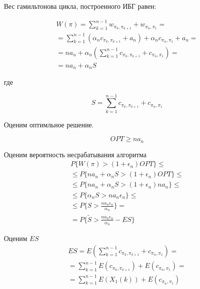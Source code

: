 \documentclass[a4paper, 14pt]{extarticle}
\begin{document}
Вес гамильтонова цикла, построенного ИБГ равен:

\begin{equation}
\begin{aligned}
W(\pi) = \sum_{k=1}^{n-1} w_{\pi_k, \pi_{k+1}} + w_{\pi_n, \pi_{1}} = \\
= \sum_{k=1}^{n-1} (\alpha_n c_{\pi_k, \pi_{k+1}} + a_n) +\alpha_n c_{\pi_n, \pi_{1}} + a_n = \\
= na_n + \alpha_n( \sum_{k=1}^{n-1} c_{\pi_k, \pi_{k+1}} + c_{\pi_n, \pi_1}) = \\
= na_n + \alpha_n S
\end{aligned}
\end{equation}

где

\begin{equation}
S = \sum_{k=1}^{n-1} c_{\pi_k, \pi_{k+1}} + c_{\pi_n, \pi_1}
\end{equation}

Оценим оптимльное решение.

\begin{equation}
OPT \geq na_n
\end{equation}

Оценим вероятность несрабатывания алгоритма
\begin{equation}
\begin{aligned}
P\{ W(\pi)>(1+\epsilon_n)OPT \} \leq \\
\leq P\{na_n + \alpha_n S > (1+\epsilon_n)OPT \} \leq \\ 
\leq P\{na_n + \alpha_n S > (1+\epsilon_n)na_n \} \leq \\
\leq P\{\alpha_n S > na_n\epsilon_n \} \leq \\
\leq P\{S >\frac{na_n\epsilon_n}{\alpha_n}  \} = \\
= P\{\tilde{S} >\frac{na_n\epsilon_n}{\alpha_n} - ES  \}
\end{aligned}
\end{equation}

Оценим $ES$
\begin{equation}
\begin{aligned}
ES = E( \sum_{k=1}^{n-1} c_{\pi_k, \pi_{k+1}} + c_{\pi_n, \pi_1} ) =\\
=  \sum_{k=1}^{n-1} E(c_{\pi_k, \pi_{k+1}}) + E(c_{\pi_n, \pi_1}) = \\
= \sum_{k=1}^{n-1} E(X_1(k)) + E(c_{\pi_n, \pi_1})
\end{aligned}
\end{equation}
\end{document}
